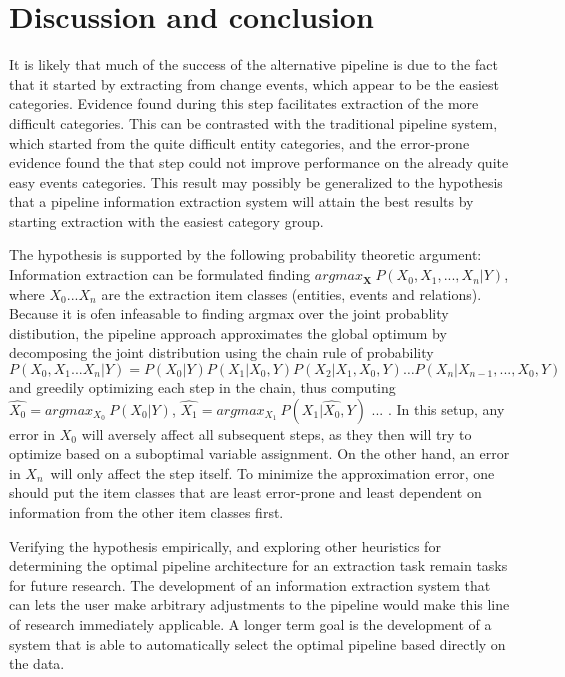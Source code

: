 \section{Discussion and conclusion}

It is likely that much of the success of the alternative pipeline is due to the fact that it started by extracting from change events, which appear to be the easiest categories. Evidence found during this step facilitates extraction of the more difficult categories. This can be contrasted with the traditional pipeline system, which started from the quite difficult entity categories, and the error-prone evidence found the that step could not improve performance on the already quite easy events categories. This result may possibly be generalized to the hypothesis that a pipeline information extraction system will attain the best results by starting extraction with the easiest category group.

The hypothesis is supported by the following probability theoretic argument: Information extraction can be formulated finding $argmax_{\boldsymbol{X}}\ P(X_0, X_1, ..., X_n | Y)$, where $X_0 ... X_n$ are the extraction item classes (entities, events and relations). Because it is ofen infeasable to finding argmax over the joint probablity distibution, the pipeline approach approximates the global optimum by decomposing the joint distribution using the chain rule of probability $P(X_0, X_1 ... X_n | Y) = P(X_0 | Y)P(X_1 | X_0, Y)P(X_2 | X_1, X_0, Y) \dots P(X_n | X_{n-1}, ..., X_0, Y)$ and greedily optimizing each step in the chain, thus computing $\hat{X_0} = argmax_{X_0}\ P(X_0 | Y)$, $\hat{X_1} = argmax_{X_1}\ P(X_1 | \hat{X_0}, Y)$ ... . In this setup, any error in $X_0$ will aversely affect all subsequent steps, as they then will try to optimize based on a suboptimal variable assignment. On the other hand, an error in $X_n$ will only affect the step itself. To minimize the approximation error, one should put the item classes that are least error-prone and least dependent on information from the other item classes first.

Verifying the hypothesis empirically, and exploring other heuristics for determining the optimal pipeline architecture for an extraction task remain tasks for future research. The development of an information extraction system that can lets the user make arbitrary adjustments to the pipeline would make this line of research immediately applicable. A longer term goal is the development of a system that is able to automatically select the optimal pipeline based directly on the data.

